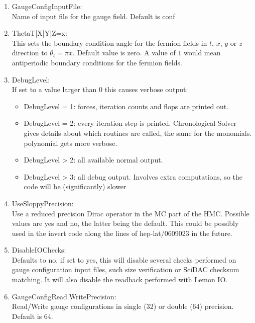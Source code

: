 \begin{enumerate}
\item {\ttfamily GaugeConfigInputFile}:\\
  Name of input file for the gauge field. Default is {\ttfamily conf}

\item {\ttfamily ThetaT|X|Y|Z=x}:\\
  This sets the boundary condition angle for the fermion fields in
  $t$, $x$, $y$ or $z$ direction to $\theta_t = \pi x$. Default value is
  zero. A value of $1$ would mean antiperiodic boundary conditions
  for the fermion fields.

\item {\ttfamily DebugLevel}:\\
  If set to a value larger than $0$ this causes verbose output:
  \begin{itemize}
  \item {\ttfamily DebugLevel = 1}: forces, iteration counts and flops are printed out.
  \item {\ttfamily DebugLevel = 2}: every iteration step is
    printed. Chronological Solver gives details about which routines
    are called, the same for the monomials. polynomial gets more verbose.
  \item {\ttfamily DebugLevel > 2}: all available normal output.
  \item {\ttfamily DebugLevel > 3}: all debug output. Involves extra
    computations, so the code will be (significantly) slower
  \end{itemize}

\item {\ttfamily UseSloppyPrecision}:\\
  Use a reduced precision Dirac operator in the MC part of the
  HMC. Possible values are yes and no, the latter being the
  default. This could be possibly used in the invert code along the 
  lines of {\ttfamily hep-lat/0609023} in the future.

\item {\ttfamily DisableIOChecks}:\\
  Defaults to no, if set to yes, this will disable several checks
  performed on gauge configuration input files, such size verification or
  SciDAC checksum matching. It will also disable the readback performed with
  Lemon IO.

\item {\ttfamily GaugeConfigRead|WritePrecision}:\\
  Read/Write gauge configurations in single (32) or double (64)
  precision. Default is 64.


\end{enumerate}
